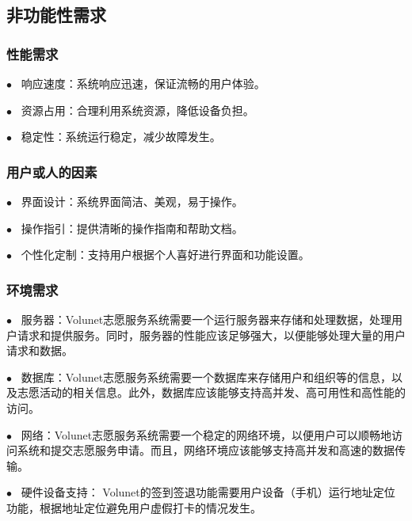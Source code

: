 %


\subsection{非功能性需求}

\subsubsection{性能需求}


 $\bullet   \enspace$ 响应速度：系统响应迅速，保证流畅的用户体验。 \hfill 
 
 $\bullet   \enspace$ 资源占用：合理利用系统资源，降低设备负担。 
  \hfill   
 
 $\bullet   \enspace$ 稳定性：系统运行稳定，减少故障发生。 
 \hfill  

\subsubsection{用户或人的因素}

 $\bullet   \enspace$ 界面设计：系统界面简洁、美观，易于操作。 \hfill 
 
 $\bullet   \enspace$ 操作指引：提供清晰的操作指南和帮助文档。 
  \hfill   
 
 $\bullet   \enspace$ 个性化定制：支持用户根据个人喜好进行界面和功能设置。
 \hfill  


\subsubsection{环境需求}

$\bullet   \enspace$ 服务器：Volunet志愿服务系统需要一个运行服务器来存储和处理数据，处理用户请求和提供服务。同时，服务器的性能应该足够强大，以便能够处理大量的用户请求和数据。
 \hfill  
 
 $\bullet   \enspace$ 数据库：Volunet志愿服务系统需要一个数据库来存储用户和组织等的信息，以及志愿活动的相关信息。此外，数据库应该能够支持高并发、高可用性和高性能的访问。
 \hfill  
 
 $\bullet   \enspace$ 网络：Volunet志愿服务系统需要一个稳定的网络环境，以便用户可以顺畅地访问系统和提交志愿服务申请。而且，网络环境应该能够支持高并发和高速的数据传输。
 \hfill  
 
  $\bullet   \enspace$ 硬件设备支持： Volunet的签到签退功能需要用户设备（手机）运行地址定位功能，根据地址定位避免用户虚假打卡的情况发生。
 \hfill  
 
